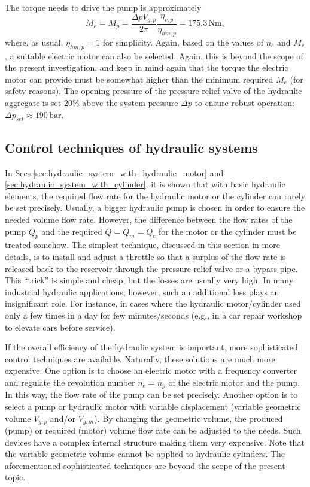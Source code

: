 The torque needs to drive the pump is approximately
%
\begin{equation}
M_e = M_p = \frac{\Delta p V_{g,p}}{2 \pi} \frac{\eta_{v,p}}{\eta_{hm,p}} = 175.3\,\mathrm{Nm},
\end{equation}
%
where, as usual, $\eta_{hm,p}=1$ for simplicity. Again, based on the values of $n_e$ and $M_e$, a suitable electric motor can also be selected. Again, this is beyond the scope of the present investigation, and keep in mind again that the torque the electric motor can provide must be somewhat higher than the minimum required $M_e$ (for safety reasons). The opening pressure of the pressure relief valve of the hydraulic aggregate is set $20\%$ above the system pressure $\Delta p$ to ensure robust operation: $\Delta p_{set} \approx 190\,\mathrm{bar}$.

\subsection{Control techniques of hydraulic systems} \label{sec:control_techniques_of_hydraulic_systems}
In Secs.\ref{sec:hydraulic_system_with_hydraulic_motor} and \ref{sec:hydraulic_system_with_cylinder}, it is shown that with basic hydraulic elements, the required flow rate for the hydraulic motor or the cylinder can rarely be set precisely. Usually, a bigger hydraulic pump is chosen in order to ensure the needed volume flow rate. However, the difference between the flow rates of the pump $Q_p$ and the required $Q=Q_m=Q_c$ for the motor or the cylinder must be treated somehow. The simplest technique, discussed in this section in more details, is to install and adjust a throttle so that a surplus of the flow rate is released back to the reservoir through the pressure relief valve or a bypass pipe. This ``trick'' is simple and cheap, but the losses are usually very high. In many industrial hydraulic applications; however, such an additional loss plays an insignificant role. For instance, in cases where the hydraulic motor/cylinder used only a few times in a day for few minutes/seconds (e.g., in a car repair workshop to elevate cars before service).

If the overall efficiency of the hydraulic system is important, more sophisticated control techniques are available. Naturally, these solutions are much more expensive. One option is to choose an electric motor with a frequency converter and regulate the revolution number $n_e=n_p$ of the electric motor and the pump. In this way, the flow rate of the pump can be set precisely. Another option is to select a pump or hydraulic motor with variable displacement (variable geometric volume $V_{g,p}$ and/or $V_{g,m}$). By changing the geometric volume, the produced (pump) or required (motor) volume flow rate can be adjusted to the needs. Such devices have a complex internal structure making them very expensive. Note that the variable geometric volume cannot be applied to hydraulic cylinders. The aforementioned sophisticated techniques are beyond the scope of the present topic.

